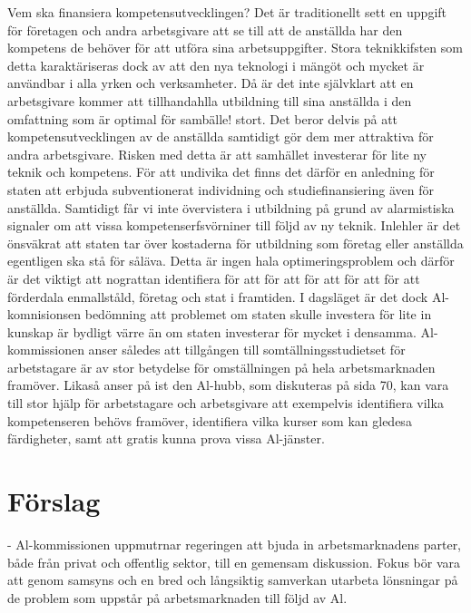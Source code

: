 {{{{{{{{{{{{Vem ska finansiera kompetensutvecklingen? Det är traditionellt sett en uppgift för företagen och andra arbetsgivare att se till att de anställda har den kompetens de behöver för att utföra sina arbetsuppgifter. Stora teknikkifsten som detta karaktäriseras dock av att den nya teknologi i mängöt och mycket är användbar i alla yrken och verksamheter. Då är det inte självklart att en arbetsgivare kommer att tillhandahlla utbildning till sina anställda i den omfattning som är optimal för sambälle! stort. Det beror delvis på att kompetensutvecklingen av de anställda samtidigt gör dem mer attraktiva för andra arbetsgivare.
Risken med detta är att samhället investerar för lite ny teknik och kompetens. För att undivika det finns det därför en anledning för staten att erbjuda subventionerat individning och studiefinansiering även för anställda. Samtidigt får vi inte övervistera i utbildning på grund av alarmistiska signaler om att vissa kompetenserfsvörniner till följd av ny teknik. Inlehler är det önsväkrat att staten tar över kostaderna för utbildning som företag eller anställda egentligen ska stå för såläva. Detta är ingen hala optimeringsproblem och därför är det viktigt att nograttan identifiera för att för att för att för att för att förderdala enmallståld, företag och stat i framtiden.
I dagsläget är det dock Al-komnisionsen bedömning att problemet om staten skulle investera för lite in kunskap är bydligt värre än om staten investerar för mycket i densamma. Al-kommissionen anser således att tillgången till somtällningsstudietset för arbetstagare är av stor betydelse för omställningen på hela arbetsmarknaden framöver. Likaså anser på ist den Al-hubb, som diskuteras på sida 70, kan vara till stor hjälp för arbetstagare och arbetsgivare att exempelvis identifiera vilka kompetenseren behövs framöver, identifiera vilka kurser som kan gledesa färdigheter, samt att gratis kunna prova vissa Al-jänster.
\section*{Förslag}
- Al-kommissionen uppmutrnar regeringen att bjuda in arbetsmarknadens parter, både från privat och offentlig sektor, till en gemensam diskussion. Fokus bör vara att genom samsyns och en bred och långsiktig samverkan utarbeta lönsningar på de problem som uppstår på arbetsmarknaden till följd av Al.

}}}}}}}}}}}}
